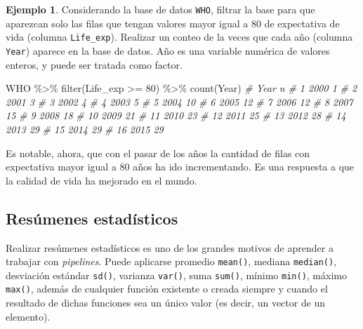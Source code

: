 \documentclass[
]{article}
\newenvironment{Shaded}{\begin{snugshade}}{\end{snugshade}}
\newcommand{\CommentTok}[1]{\textcolor[rgb]{0.56,0.35,0.01}{\textit{#1}}}
\newcommand{\DecValTok}[1]{\textcolor[rgb]{0.00,0.00,0.81}{#1}}
\newcommand{\FunctionTok}[1]{\textcolor[rgb]{0.00,0.00,0.00}{#1}}
\newcommand{\NormalTok}[1]{#1}
\newcommand{\SpecialCharTok}[1]{\textcolor[rgb]{0.00,0.00,0.00}{#1}}
\theoremstyle{definition}
\theoremstyle{definition}
\newtheorem{example}{Ejemplo}[section]
\theoremstyle{definition}
\theoremstyle{definition}
\theoremstyle{remark}
\begin{document}
\begin{example}

Considerando la base de datos \texttt{WHO}, filtrar la base para que aparezcan solo las filas que tengan valores mayor igual a 80 de expectativa de vida (columna \texttt{Life\_exp}). Realizar un conteo de la veces que cada año (columna \texttt{Year}) aparece en la base de datos. Año es una variable numérica de valores enteros, y puede ser tratada como factor.

\begin{Shaded}
\begin{Highlighting}[]
\NormalTok{WHO }\SpecialCharTok{\%\textgreater{}\%} 
  \FunctionTok{filter}\NormalTok{(Life\_exp }\SpecialCharTok{\textgreater{}=} \DecValTok{80}\NormalTok{) }\SpecialCharTok{\%\textgreater{}\%} 
  \FunctionTok{count}\NormalTok{(Year)}
\CommentTok{\#    Year  n}
\CommentTok{\# 1  2000  1}
\CommentTok{\# 2  2001  3}
\CommentTok{\# 3  2002  4}
\CommentTok{\# 4  2003  5}
\CommentTok{\# 5  2004 10}
\CommentTok{\# 6  2005 12}
\CommentTok{\# 7  2006 12}
\CommentTok{\# 8  2007 15}
\CommentTok{\# 9  2008 18}
\CommentTok{\# 10 2009 21}
\CommentTok{\# 11 2010 23}
\CommentTok{\# 12 2011 25}
\CommentTok{\# 13 2012 28}
\CommentTok{\# 14 2013 29}
\CommentTok{\# 15 2014 29}
\CommentTok{\# 16 2015 29}
\end{Highlighting}
\end{Shaded}

\end{example}

Es notable, ahora, que con el pasar de los años la cantidad de filas con expectativa mayor igual a 80 años ha ido incrementando. Es una respuesta a que la calidad de vida ha mejorado en el mundo.

\hypertarget{resuxfamenes-estaduxedsticos}{%
\subsection{Resúmenes estadísticos}\label{resuxfamenes-estaduxedsticos}}

Realizar resúmenes estadísticos es uno de los grandes motivos de aprender a trabajar con \emph{pipelines}. Puede aplicarse promedio \texttt{mean()}, mediana \texttt{median()}, desviación estándar \texttt{sd()}, varianza \texttt{var()}, suma \texttt{sum()}, mínimo \texttt{min()}, máximo \texttt{max()}, además de cualquier función existente o creada siempre y cuando el resultado de dichas funciones sea un único valor (es decir, un vector de un elemento).
\end{document}
